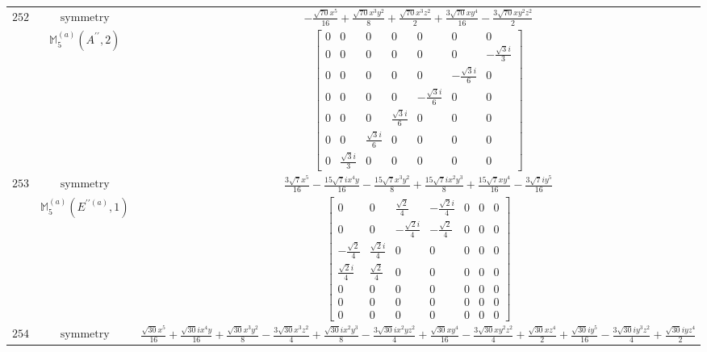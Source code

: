 \documentclass[fleqn,8pt,landscape]{jsarticle}
\begin{document}
\begin{longtable}{ccc}
$ 252 $ & $ \text{symmetry} $ & $ - \frac{\sqrt{70} x^{5}}{16} + \frac{\sqrt{70} x^{3} y^{2}}{8} + \frac{\sqrt{70} x^{3} z^{2}}{2} + \frac{3 \sqrt{70} x y^{4}}{16} - \frac{3 \sqrt{70} x y^{2} z^{2}}{2} $ \\
$  $ & $ \mathbb{M}_{5}^{(a)}(A^{\prime\prime},2) $ & $ \begin{bmatrix} 0 & 0 & 0 & 0 & 0 & 0 & 0 \\ 0 & 0 & 0 & 0 & 0 & 0 & - \frac{\sqrt{3} i}{3} \\ 0 & 0 & 0 & 0 & 0 & - \frac{\sqrt{3} i}{6} & 0 \\ 0 & 0 & 0 & 0 & - \frac{\sqrt{3} i}{6} & 0 & 0 \\ 0 & 0 & 0 & \frac{\sqrt{3} i}{6} & 0 & 0 & 0 \\ 0 & 0 & \frac{\sqrt{3} i}{6} & 0 & 0 & 0 & 0 \\ 0 & \frac{\sqrt{3} i}{3} & 0 & 0 & 0 & 0 & 0 \end{bmatrix} $ \\ \hline
$ 253 $ & $ \text{symmetry} $ & $ \frac{3 \sqrt{7} x^{5}}{16} - \frac{15 \sqrt{7} i x^{4} y}{16} - \frac{15 \sqrt{7} x^{3} y^{2}}{8} + \frac{15 \sqrt{7} i x^{2} y^{3}}{8} + \frac{15 \sqrt{7} x y^{4}}{16} - \frac{3 \sqrt{7} i y^{5}}{16} $ \\
$  $ & $ \mathbb{M}_{5}^{(a)}(E^{\prime\prime(a)},1) $ & $ \begin{bmatrix} 0 & 0 & \frac{\sqrt{2}}{4} & - \frac{\sqrt{2} i}{4} & 0 & 0 & 0 \\ 0 & 0 & - \frac{\sqrt{2} i}{4} & - \frac{\sqrt{2}}{4} & 0 & 0 & 0 \\ - \frac{\sqrt{2}}{4} & \frac{\sqrt{2} i}{4} & 0 & 0 & 0 & 0 & 0 \\ \frac{\sqrt{2} i}{4} & \frac{\sqrt{2}}{4} & 0 & 0 & 0 & 0 & 0 \\ 0 & 0 & 0 & 0 & 0 & 0 & 0 \\ 0 & 0 & 0 & 0 & 0 & 0 & 0 \\ 0 & 0 & 0 & 0 & 0 & 0 & 0 \end{bmatrix} $ \\ \hline
$ 254 $ & $ \text{symmetry} $ & $ \frac{\sqrt{30} x^{5}}{16} + \frac{\sqrt{30} i x^{4} y}{16} + \frac{\sqrt{30} x^{3} y^{2}}{8} - \frac{3 \sqrt{30} x^{3} z^{2}}{4} + \frac{\sqrt{30} i x^{2} y^{3}}{8} - \frac{3 \sqrt{30} i x^{2} y z^{2}}{4} + \frac{\sqrt{30} x y^{4}}{16} - \frac{3 \sqrt{30} x y^{2} z^{2}}{4} + \frac{\sqrt{30} x z^{4}}{2} + \frac{\sqrt{30} i y^{5}}{16} - \frac{3 \sqrt{30} i y^{3} z^{2}}{4} + \frac{\sqrt{30} i y z^{4}}{2} $ \\

\end{longtable}
\end{document}
